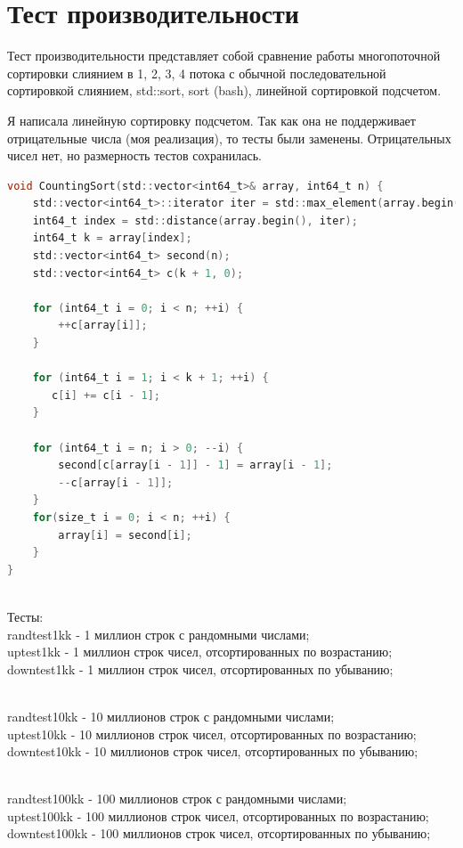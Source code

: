 \section{Тест производительности}
Тест производительности представляет собой сравнение работы многопоточной сортировки слиянием в 1, 2, 3, 4 потока с обычной последовательной сортировкой слиянием, std::sort, sort (bash), линейной сортировкой подсчетом.

Я написала линейную сортировку подсчетом. Так как она не поддерживает отрицательные числа (моя реализация), то тесты были заменены. Отрицательных чисел нет, но размерность тестов сохранилась.
\begin{lstlisting}[language=C]
void CountingSort(std::vector<int64_t>& array, int64_t n) {
    std::vector<int64_t>::iterator iter = std::max_element(array.begin(), array.end());
    int64_t index = std::distance(array.begin(), iter);
    int64_t k = array[index];
    std::vector<int64_t> second(n);
    std::vector<int64_t> c(k + 1, 0);
 
    for (int64_t i = 0; i < n; ++i) {
        ++c[array[i]];
    }
   
    for (int64_t i = 1; i < k + 1; ++i) {
       c[i] += c[i - 1];
    }
  
    for (int64_t i = n; i > 0; --i) {
        second[c[array[i - 1]] - 1] = array[i - 1];
        --c[array[i - 1]];
    }
    for(size_t i = 0; i < n; ++i) {
        array[i] = second[i];
    }
}
\end{lstlisting}

\\Тесты:
\\randtest1kk - 1 миллион строк с рандомными числами;
\\uptest1kk - 1 миллион строк чисел, отсортированных по возрастанию;
\\downtest1kk - 1 миллион строк чисел, отсортированных по убыванию;

\\randtest10kk - 10 миллионов строк с рандомными числами;
\\uptest10kk - 10 миллионов строк чисел, отсортированных по возрастанию;
\\downtest10kk - 10 миллионов строк чисел, отсортированных по убыванию;

\\randtest100kk - 100 миллионов строк с рандомными числами;
\\uptest100kk - 100 миллионов строк чисел, отсортированных по возрастанию;
\\downtest100kk - 100 миллионов строк чисел, отсортированных по убыванию;

